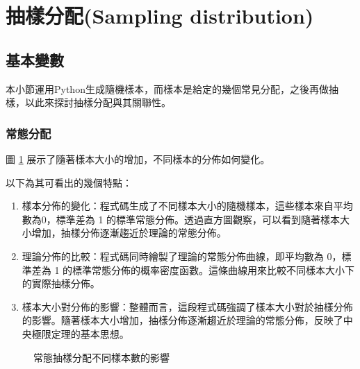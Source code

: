 \section{抽樣分配(Sampling distribution)}
\subsection{基本變數}
本小節運用Python生成隨機樣本，而樣本是給定的幾個常見分配，之後再做抽樣，以此來探討抽樣分配與其關聯性。
\subsubsection{常態分配}
圖 \ref{fig:normal-distribution_sample} 展示了隨著樣本大小的增加，不同樣本的分佈如何變化。

以下為其可看出的幾個特點：

\begin{enumerate}
\item 樣本分佈的變化：程式碼生成了不同樣本大小的隨機樣本，這些樣本來自平均數為0，標準差為 1 的標準常態分佈。透過直方圖觀察，可以看到隨著樣本大小增加，抽樣分佈逐漸趨近於理論的常態分佈。
\item 理論分佈的比較：程式碼同時繪製了理論的常態分佈曲線，即平均數為 0，標準差為 1 的標準常態分佈的概率密度函數。這條曲線用來比較不同樣本大小下的實際抽樣分佈。
\item 樣本大小對分佈的影響：整體而言，這段程式碼強調了樣本大小對於抽樣分佈的影響。隨著樣本大小增加，抽樣分佈逐漸趨近於理論的常態分佈，反映了中央極限定理的基本思想。
\end{enumerate}

\begin{figure}[h]
    \caption{常態抽樣分配不同樣本數的影響}
    \label{fig:normal-distribution_sample}
\end{figure}

